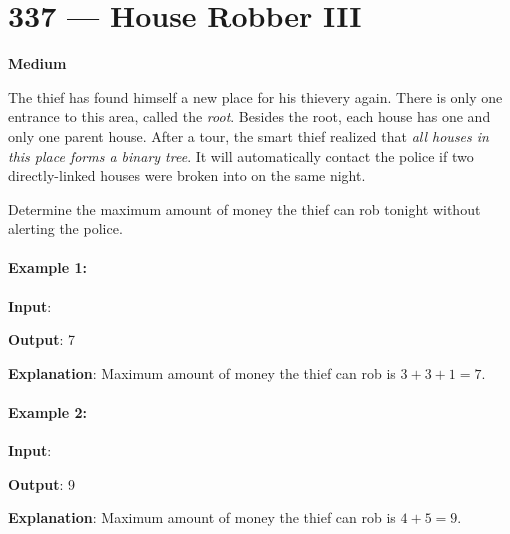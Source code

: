 \section{337 --- House Robber III}

\textbf{Medium}

The thief has found himself a new place for his thievery again. There is only one entrance to this area, called the \textit{root}. Besides the root, each house has one and only one parent house. After a tour, the smart thief realized that \textit{all houses in this place forms a binary tree}. It will automatically contact the police if two directly-linked houses were broken into on the same night.

Determine the maximum amount of money the thief can rob tonight without alerting the police.

\paragraph{Example 1:}
\begin{flushleft}


\textbf{Input}: 

\begin{figure}[H]
\end{figure}

\textbf{Output}: 7
 
\textbf{Explanation}: Maximum amount of money the thief can rob is $3 + 3 + 1 = 7$.
\end{flushleft}

\paragraph{Example 2:}
\begin{flushleft}


\textbf{Input}: \fcj{[3,4,5,1,3,null,1]}

\begin{figure}[H]
\end{figure}

\textbf{Output}: 9

\textbf{Explanation}: Maximum amount of money the thief can rob is $4 + 5 = 9$.

\end{flushleft}

